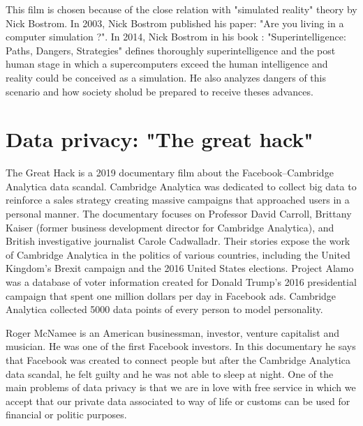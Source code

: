  This film is chosen because of the close relation with  "simulated reality" theory by Nick Bostrom.
 In 2003, Nick Bostrom published his paper: "Are you living in a computer simulation ?".
 In 2014, Nick Bostrom in his book : "Superintelligence: Paths, Dangers, Strategies" 
 defines thoroughly superintelligence and the post human stage in which a supercomputers exceed the human intelligence and reality could be 
 conceived as a simulation. He also analyzes dangers of this scenario and 
 how society sholud be prepared to receive theses advances. 
 
 
 
   
    
  
   
 \section*{Data privacy: "The great hack"}
 The Great Hack is a 2019 documentary film about the Facebook–Cambridge Analytica data scandal.
 Cambridge Analytica was dedicated to collect big data to reinforce a  sales strategy creating massive campaigns that approached users in a 
 personal manner.
 The documentary focuses on Professor David Carroll, Brittany Kaiser (former business development director for Cambridge Analytica), and 
 British investigative journalist Carole Cadwalladr. Their stories expose the work of Cambridge Analytica in the politics of various 
 countries, including the United Kingdom's Brexit campaign and the 2016 United States elections.   
 Project Alamo was a database of voter information created for Donald Trump's 2016 presidential campaign
 that spent one million dollars per day in Facebook ads. 
 Cambridge Analytica collected 5000 data points of every person to model personality.   
  
 Roger McNamee is an American businessman, investor, venture capitalist and musician.
 He was one of the first Facebook investors. In this documentary he says that 
 Facebook was created to connect people but after the Cambridge Analytica data scandal, he felt guilty and 
 he was not able to sleep at night. 
 One of the main problems of data privacy is that we are in love with free service in which   we accept 
 that our private data associated to way of life or customs can be used for financial or politic purposes. 
 
